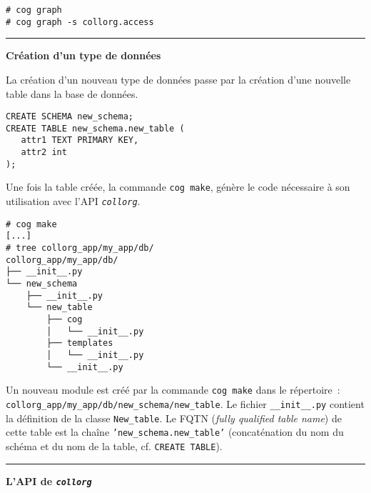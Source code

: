 \documentclass[a4paper]{letter}
\newcommand{\section}[1]{
\rule{0.5cm}{0.1pt} \textbf{\large {#1}} \hrulefill
}
\newcommand{\collorg}{\texttt{\textit{collorg}}}
\begin{document}
\begin{multicols}{3}
\begin{description}
\begin{scriptsize}
\begin{verbatim}
# cog graph
# cog graph -s collorg.access
\end{verbatim}
\end{scriptsize}
\end{description}





\section{Création d'un type de données}

La création d'un nouveau type de données passe par la création d'une nouvelle table dans la base de données.

\begin{scriptsize}
\begin{verbatim}
CREATE SCHEMA new_schema;
CREATE TABLE new_schema.new_table (
   attr1 TEXT PRIMARY KEY,
   attr2 int
);
\end{verbatim}
\end{scriptsize}

Une fois la table créée, la commande \texttt{cog make}, génère le code nécessaire à son utilisation avec l'API \collorg.

\begin{scriptsize}
\begin{verbatim}
# cog make
[...]
# tree collorg_app/my_app/db/
collorg_app/my_app/db/
├── __init__.py
└── new_schema
    ├── __init__.py
    └── new_table
        ├── cog
        │   └── __init__.py
        ├── templates
        │   └── __init__.py
        └── __init__.py
\end{verbatim}
\end{scriptsize}

Un nouveau module est créé par la commande \texttt{cog make} dans le répertoire~:\\
\texttt{collorg\_app/my\_app/db/new\_schema/new\_table}. Le fichier \texttt{\_\_init\_\_.py} contient la définition de la classe \texttt{New\_table}. Le FQTN (\textit{fully qualified table name}) de cette table est la chaîne \texttt{'new\_schema.new\_table'} (concaténation du nom du schéma et du nom de la table, cf. \texttt{CREATE TABLE}).



\section{L'API de \collorg}


\end{multicols}
\end{document}
